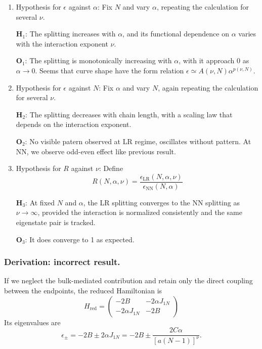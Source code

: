 \documentclass[../../../main.tex]{subfiles}
\begin{document}
\begin{enumerate}
  \item Hypothesis for $\epsilon$ against $\alpha$: Fix $N$ and vary \(\alpha\), repeating the calculation for several \(\nu\).

        $\mathbf{H}_1$: The splitting increases with \(\alpha\), and its functional dependence on \(\alpha\) varies with the interaction exponent \(\nu\).

        $\mathbf{O}_1$: The splitting is monotonically increasing with $\alpha$, with it approach 0 as $\alpha\to0$. Seems that curve shape have the form relation $\epsilon\simeq A(\nu,N)\alpha^{p(\nu,N)}$.

  \item Hypothesis for \(\epsilon\) against \(N\): Fix \(\alpha\) and vary \(N\), again repeating the calculation for several \(\nu\).

        $\mathbf{H}_2$: The splitting decreases with chain length, with a scaling law that depends on the interaction exponent.

        $\mathbf{O}_2$: No visible patern observed at LR regime, oscillates without pattern. At NN, we observe odd-even effect like previous result.

  \item Hypothesis for \(R\) against \(\nu\): Define
        \begin{equation*}
          R(N,\alpha,\nu) =\frac{\epsilon_{\mathrm{LR}}(N,\alpha,\nu)}{\epsilon_{\mathrm{NN}}(N,\alpha)}
        \end{equation*}

        $\mathbf{H}_3$: At fixed \(N\) and \(\alpha\), the LR splitting converges to the NN splitting as \(\nu\rightarrow\infty\), provided the interaction is normalized consistently and the same eigenstate pair is tracked.

        $\mathbf{O}_3$: It does converge to 1 as expected.
\end{enumerate}


\subsubsection{Derivation: incorrect result.}
If we neglect the bulk-mediated contribution and retain only the direct coupling between the endpoints, the reduced Hamiltonian is
\begin{equation*}
  H_{\mathrm{red}}=
\begin{pmatrix}
-2B & -2\alpha J_{1N}\\
-2\alpha J_{1N} & -2B
\end{pmatrix}
\end{equation*}
Its eigenvalues are
\begin{equation*}
  \epsilon_\pm=-2B\pm2\alpha J_{1N} = -2B \pm \frac{2C\alpha}{[a(N-1)]^\nu}.
\end{equation*}
\end{document}
